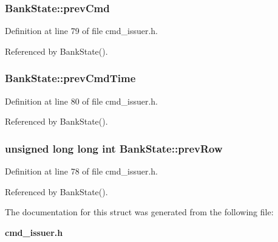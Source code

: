 \subsubsection[{prevCmd}]{ {\bf BankState::prevCmd}}\label{structBankState_6d394b294e116b22fa92b1ce56e464cb}




Definition at line 79 of file cmd\_\-issuer.h.

Referenced by BankState().
\subsubsection[{prevCmdTime}]{ {\bf BankState::prevCmdTime}}\label{structBankState_3399a6d74f9230741e04eb73281d3cf1}




Definition at line 80 of file cmd\_\-issuer.h.

Referenced by BankState().
\subsubsection[{prevRow}]{\setlength{\rightskip}{0pt plus 5cm}unsigned long long int {\bf BankState::prevRow}}\label{structBankState_5d259a3c6267dbdd8c928f28b16e628f}




Definition at line 78 of file cmd\_\-issuer.h.

Referenced by BankState().

The documentation for this struct was generated from the following file:\begin{CompactItemize}
\item 
{\bf cmd\_\-issuer.h}\end{CompactItemize}
